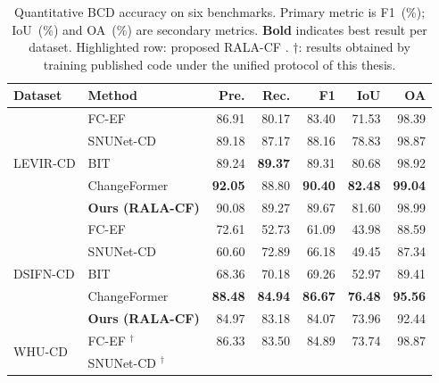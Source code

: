 \begin{table}[htbp]
\centering
\caption{Quantitative \ac{BCD} accuracy on six benchmarks. Primary metric is F1~(\%); \ac{IoU}~(\%) and \ac{OA}~(\%) are secondary metrics. \textbf{Bold} indicates best result per dataset. \colorbox{pastelorange}{Highlighted} row: proposed \ac{RALA-CF} \cite{acuna2026efficient}. $\dagger$: results obtained by training published code under the unified protocol of this thesis.}
\label{tab:main_results}
\renewcommand{\arraystretch}{1.15} {\small
\begin{tabularx}{\textwidth}{|l|X|r|r|r|r|r|}
\hline
\textbf{Dataset} & \textbf{Method}
    & \textbf{Pre.} & \textbf{Rec.} & \textbf{F1}
    & \textbf{IoU} & \textbf{OA} \\
\hline\hline
\multirow{5}{*}{LEVIR-CD}
    & FC-EF \cite{Daudt2018SiamICIP}
        & 86.91 & 80.17 & 83.40 & 71.53 & 98.39 \\ \cline{2-7}
    & SNUNet-CD \cite{Fang2021SNUNetCD}
        & 89.18 & 87.17 & 88.16 & 78.83 & 98.87 \\ \cline{2-7}
    & BIT \cite{Chen2022BIT}
        & 89.24 & \textbf{89.37} & 89.31 & 80.68 & 98.92 \\ \cline{2-7}
    & ChangeFormer \cite{Bandara2022ChangeFormer}
        & \textbf{92.05} & 88.80 & \textbf{90.40} & \textbf{82.48} & \textbf{99.04} \\ \cline{2-7}
\rowcolor{pastelorange}
    & \textbf{Ours (RALA-CF)}
        & 90.08 & 89.27 & 89.67
        & 81.60 & 98.99 \\
\hline
\multirow{5}{*}{DSIFN-CD}
    & FC-EF \cite{Daudt2018SiamICIP}
        & 72.61 & 52.73 & 61.09 & 43.98 & 88.59 \\ \cline{2-7}
    & SNUNet-CD \cite{Fang2021SNUNetCD}
        & 60.60 & 72.89 & 66.18 & 49.45 & 87.34 \\ \cline{2-7}
    & BIT \cite{Chen2022BIT}
        & 68.36 & 70.18 & 69.26 & 52.97 & 89.41 \\ \cline{2-7}
    & ChangeFormer \cite{Bandara2022ChangeFormer}
        & \textbf{88.48} & \textbf{84.94} & \textbf{86.67} & \textbf{76.48} & \textbf{95.56} \\ \cline{2-7}
\rowcolor{pastelorange}
    & \textbf{Ours (RALA-CF)}
        & 84.97 & 83.18 & 84.07
        & 73.96 & 92.44 \\
\hline
\multirow{5}{*}{WHU-CD}
    & FC-EF \cite{Daudt2018SiamICIP}$^\dagger$
        & 86.33 & 83.50 & 84.89 & 73.74 & 98.87 \\ \cline{2-7}
    & SNUNet-CD \cite{Fang2021SNUNetCD}$^\dagger$

\end{tabularx}}
\end{table}
